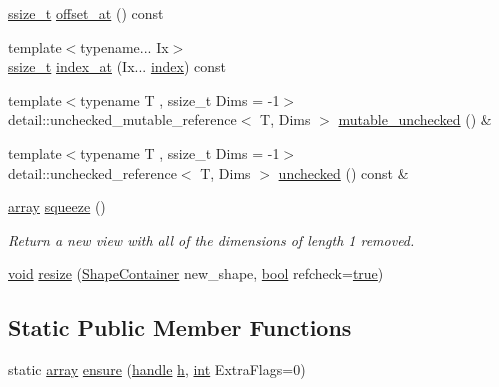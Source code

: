 \begin{DoxyCompactItemize}
\item 
\mbox{\hyperlink{detail_2common_8h_ac430d16fc097b3bf0a7469cfd09decda}{ssize\+\_\+t}} \mbox{\hyperlink{classarray_ada98138e241b891a543478dbe6494f17}{offset\+\_\+at}} () const
\item 
{\footnotesize template$<$typename... Ix$>$ }\\\mbox{\hyperlink{detail_2common_8h_ac430d16fc097b3bf0a7469cfd09decda}{ssize\+\_\+t}} \mbox{\hyperlink{classarray_a48d7b1bd08e0a5cf1ef27a6996421e73}{index\+\_\+at}} (Ix... \mbox{\hyperlink{_s_d_l__opengl__glext_8h_a57f14e05b1900f16a2da82ade47d0c6d}{index}}) const
\item 
{\footnotesize template$<$typename T , ssize\+\_\+t Dims = -\/1$>$ }\\detail\+::unchecked\+\_\+mutable\+\_\+reference$<$ T, Dims $>$ \mbox{\hyperlink{classarray_a93018344b9a8d27eacbdd7837f6efcab}{mutable\+\_\+unchecked}} () \&
\item 
{\footnotesize template$<$typename T , ssize\+\_\+t Dims = -\/1$>$ }\\detail\+::unchecked\+\_\+reference$<$ T, Dims $>$ \mbox{\hyperlink{classarray_a453dfcd16f86df11e0a6ede98b04b7a0}{unchecked}} () const \&
\item 
\mbox{\hyperlink{classarray}{array}} \mbox{\hyperlink{classarray_af0e9b034604a5306671cdb114855a972}{squeeze}} ()
\begin{DoxyCompactList}\small\item\em Return a new view with all of the dimensions of length 1 removed. \end{DoxyCompactList}\item 
\mbox{\hyperlink{_s_d_l__opengles2__gl2ext_8h_ae5d8fa23ad07c48bb609509eae494c95}{void}} \mbox{\hyperlink{classarray_a3e03dfffbf6c992364c052cf615db45b}{resize}} (\mbox{\hyperlink{classarray_a3378d7821106645fa3a88c5222e127e0}{Shape\+Container}} new\+\_\+shape, \mbox{\hyperlink{asdl_8h_af6a258d8f3ee5206d682d799316314b1}{bool}} refcheck=\mbox{\hyperlink{asdl_8h_af6a258d8f3ee5206d682d799316314b1a08f175a5505a10b9ed657defeb050e4b}{true}})
\end{DoxyCompactItemize}
\subsection*{Static Public Member Functions}
\begin{DoxyCompactItemize}
\item 
static \mbox{\hyperlink{classarray}{array}} \mbox{\hyperlink{classarray_a4b19125eed75474c00a93c829dba3a8b}{ensure}} (\mbox{\hyperlink{classhandle}{handle}} \mbox{\hyperlink{_s_d_l__opengl__glext_8h_afa0fb1b5e976920c0abeff2dca3ed774}{h}}, \mbox{\hyperlink{warnings_8h_a74f207b5aa4ba51c3a2ad59b219a423b}{int}} Extra\+Flags=0)
\end{DoxyCompactItemize}
